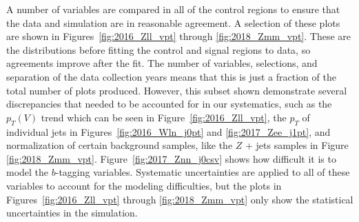A number of variables are compared in all of the control regions
to ensure that the data and simulation are in reasonable agreement.
A selection of these plots are shown in Figures~\ref{fig:2016_Zll_vpt} through \ref{fig:2018_Zmm_vpt}.
These are the distributions before fitting the control and signal regions to data,
so agreements improve after the fit.
The number of variables, selections, and separation of the data collection years
means that this is just a fraction of the total number of plots produced.
However, this subset shown demonstrate several discrepancies that needed to be accounted for in our systematics,
such as the $p_T(V)$ trend which can be seen in Figure~\ref{fig:2016_Zll_vpt},
the $p_T$ of individual jets in Figures~\ref{fig:2016_Wln_j0pt} and \ref{fig:2017_Zee_j1pt},
and normalization of certain background samples, like the $Z$ + jets samples in Figure~ \ref{fig:2018_Zmm_vpt}.
Figure~\ref{fig:2017_Znn_j0csv} shows how difficult it is to model the $b$-tagging variables.
Systematic uncertainties are applied to all of these variables to account for the modeling difficulties,
but the plots in  Figures~\ref{fig:2016_Zll_vpt} through \ref{fig:2018_Zmm_vpt} only show the statistical
uncertainties in the simulation.

